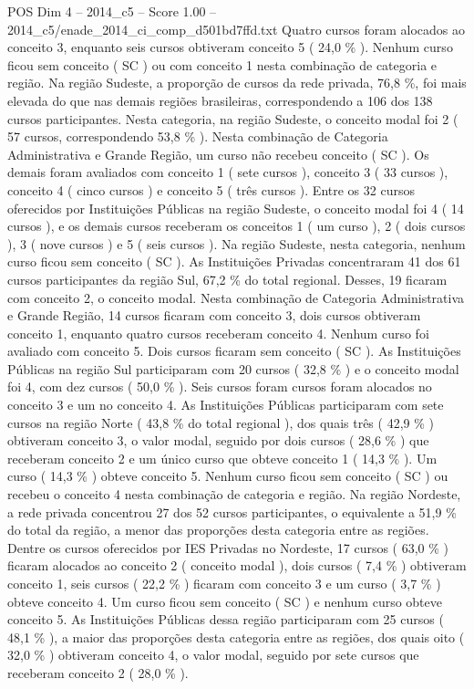 \begin{textsample}{POS Dim 4 – 2014\_c5 – Score 1.00 – 2014\_c5/enade\_2014\_ci\_comp\_d501bd7ffd.txt}
Quatro cursos foram alocados ao conceito 3, enquanto seis cursos obtiveram conceito 5 ( 24,0 \% ).
Nenhum curso ficou sem conceito ( SC ) ou com conceito 1 nesta combinação de categoria e região.
Na região Sudeste, a proporção de cursos da rede privada, 76,8 \%, foi mais elevada do que nas demais regiões brasileiras, correspondendo a 106 dos 138 cursos participantes.
Nesta categoria, na região Sudeste, o conceito modal foi 2 ( 57 cursos, correspondendo 53,8 \% ).
Nesta combinação de Categoria Administrativa e Grande Região, um curso não recebeu conceito ( SC ).
Os demais foram avaliados com conceito 1 ( sete cursos ), conceito 3 ( 33 cursos ), conceito 4 ( cinco cursos ) e conceito 5 ( três cursos ).
Entre os 32 cursos oferecidos por Instituições Públicas na região Sudeste, o conceito modal foi 4 ( 14 cursos ), e os demais cursos receberam os conceitos 1 ( um curso ), 2 ( dois cursos ), 3 ( nove cursos ) e 5 ( seis cursos ).
Na região Sudeste, nesta categoria, nenhum curso ficou sem conceito ( SC ).
As Instituições Privadas concentraram 41 dos 61 cursos participantes da região Sul, 67,2 \% do total regional.
Desses, 19 ficaram com conceito 2, o conceito modal.
Nesta combinação de Categoria Administrativa e Grande Região, 14 cursos ficaram com conceito 3, dois cursos obtiveram conceito 1, enquanto quatro cursos receberam conceito 4.
Nenhum curso foi avaliado com conceito 5.
Dois cursos ficaram sem conceito ( SC ).
As Instituições Públicas na região Sul participaram com 20 cursos ( 32,8 \% ) e o conceito modal foi 4, com dez cursos ( 50,0 \% ).
Seis cursos foram cursos foram alocados no conceito 3 e um no conceito 4.
As Instituições Públicas participaram com sete cursos na região Norte ( 43,8 \% do total regional ), dos quais três ( 42,9 \% ) obtiveram conceito 3, o valor modal, seguido por dois cursos ( 28,6 \% ) que receberam conceito 2 e um único curso que obteve conceito 1 ( 14,3 \% ).
Um curso ( 14,3 \% ) obteve conceito 5.
Nenhum curso ficou sem conceito ( SC ) ou recebeu o conceito 4 nesta combinação de categoria e região.
Na região Nordeste, a rede privada concentrou 27 dos 52 cursos participantes, o equivalente a 51,9 \% do total da região, a menor das proporções desta categoria entre as regiões.
Dentre os cursos oferecidos por IES Privadas no Nordeste, 17 cursos ( 63,0 \% ) ficaram alocados ao conceito 2 ( conceito modal ), dois cursos ( 7,4 \% ) obtiveram conceito 1, seis cursos ( 22,2 \% ) ficaram com conceito 3 e um curso ( 3,7 \% ) obteve conceito 4.
Um curso ficou sem conceito ( SC ) e nenhum curso obteve conceito 5.
As Instituições Públicas dessa região participaram com 25 cursos ( 48,1 \% ), a maior das proporções desta categoria entre as regiões, dos quais oito ( 32,0 \% ) obtiveram conceito 4, o valor modal, seguido por sete cursos que receberam conceito 2 ( 28,0 \% ).

\end{textsample}
